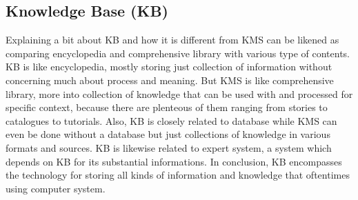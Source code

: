 \subsection{Knowledge Base (KB)}

Explaining a bit about \ac{KB} and how it is different from \ac{KMS} can be likened as comparing encyclopedia and comprehensive library with various type of contents.
\ac{KB} is like encyclopedia, mostly storing just collection of information without concerning much about process and meaning.
But \ac{KMS} is like comprehensive library, more into collection of knowledge that can be used with and processed for specific context, because there are plenteous of them ranging from stories to catalogues to tutorials.
Also, \ac{KB} is closely related to database while \ac{KMS} can even be done without a database but just collections of knowledge in various formats and sources.
\ac{KB} is likewise related to expert system, a system which depends on \ac{KB} for its substantial informations.
In conclusion, \ac{KB} encompasses the technology for storing all kinds of information and knowledge that oftentimes using computer system.
